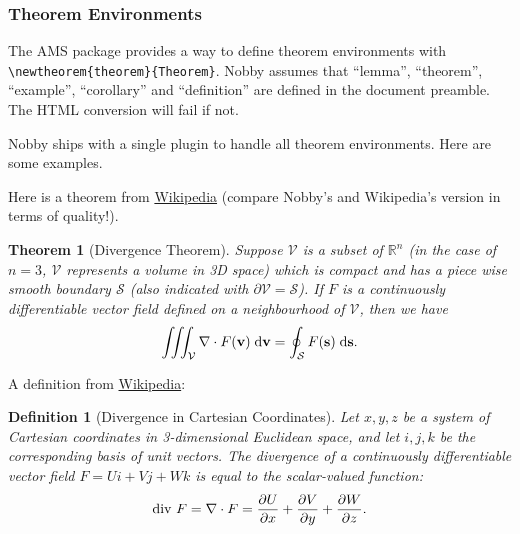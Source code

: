 \documentclass[10pt]{article}
\newtheorem{theorem}{Theorem}
\newtheorem{definition}{Definition}
\newcommand{\mvec}[1]{\mathbf{#1}}
\begin{document}
\subsubsection{Theorem Environments}
The AMS package provides a way to define theorem environments with
\texttt{\textbackslash{newtheorem\{theorem\}\{Theorem\}}}. Nobby
assumes that ``lemma'', ``theorem'', ``example'', ``corollary'' and
``definition'' are defined in the document preamble. The HTML conversion
will fail if not.

Nobby ships with a single plugin to handle all theorem
environments. Here are some examples.

Here is a theorem from
\href{http://en.wikipedia.org/wiki/Divergence_theorem}{Wikipedia} 
(compare Nobby's and Wikipedia's version in terms of quality!).
\begin{theorem}[Divergence Theorem]
  \label{thm:div}
  Suppose $\mathcal{V}$ is a subset of $\mathbb{R}^n$ (in the case of
  $n=3$, $\mathcal{V}$ represents a volume in 3D space) which is
  compact and has a piece wise smooth boundary $\mathcal{S}$ (also
  indicated with $\partial\mathcal{V} = \mathcal{S}$). If $F$ is a
  continuously differentiable vector field defined on a neighbourhood
  of $\mathcal{V}$, then we have
  \begin{align}
    \iiint_{\mathcal{V}} \nabla \cdot F(\mvec{v})\; \textnormal{d}\mvec{v}
    = \oint_{\mathcal{S}} F(\mvec{s})\; \textnormal{d}\mvec{s}.
  \end{align}
\end{theorem}

A definition from \href{http://en.wikipedia.org/wiki/Divergence}{Wikipedia}:
\begin{definition}[Divergence in Cartesian Coordinates]
  \label{def:div}
  Let $x, y, z$ be a system of Cartesian coordinates in 3-dimensional
  Euclidean space, and let $i, j, k$ be the corresponding basis of unit
  vectors. The divergence of a continuously differentiable vector
  field $F = U i + V j + W k$ is equal to the scalar-valued function:
  \begin{align}
    \textnormal{div } F = \nabla \cdot F = 
    \frac{\partial U}{\partial x} +
    \frac{\partial V}{\partial y} +
    \frac{\partial W}{\partial z}.
  \end{align}
\end{definition}
\end{document}
